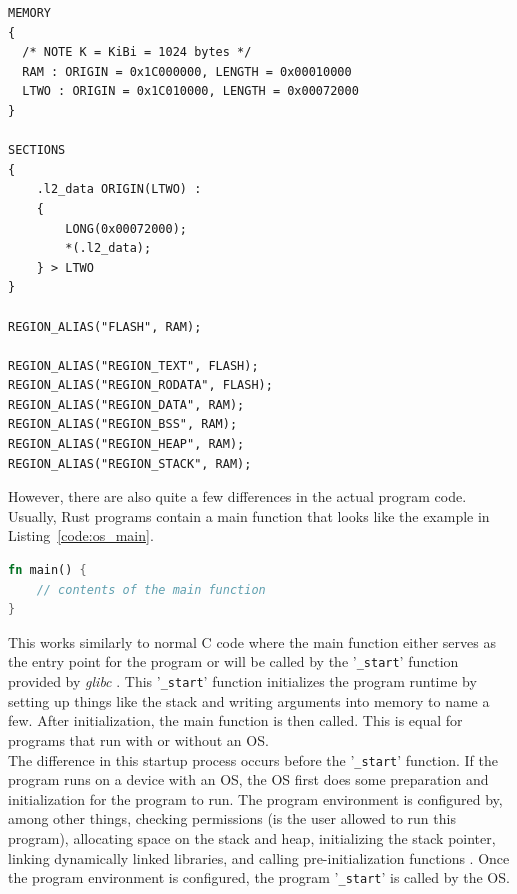 \begin{minipage}{\textwidth}
\begin{lstlisting}[style=colorEX,caption={Example memory.x file},label={code:memory_x}]
MEMORY
{
  /* NOTE K = KiBi = 1024 bytes */
  RAM : ORIGIN = 0x1C000000, LENGTH = 0x00010000
  LTWO : ORIGIN = 0x1C010000, LENGTH = 0x00072000
}

SECTIONS
{
    .l2_data ORIGIN(LTWO) :
    {
        LONG(0x00072000);
        *(.l2_data);
    } > LTWO
}

REGION_ALIAS("FLASH", RAM);

REGION_ALIAS("REGION_TEXT", FLASH);
REGION_ALIAS("REGION_RODATA", FLASH);
REGION_ALIAS("REGION_DATA", RAM);
REGION_ALIAS("REGION_BSS", RAM);
REGION_ALIAS("REGION_HEAP", RAM);
REGION_ALIAS("REGION_STACK", RAM);

\end{lstlisting}
\end{minipage}


However, there are also quite a few differences in the actual program code.
Usually, Rust programs contain a main function that looks like the example in Listing~\ref{code:os_main}.
\\
\begin{minipage}{\textwidth}
\begin{lstlisting}[style=colorEX,language=Rust,caption={Standard main function in Rust},label={code:os_main}]
fn main() {
    // contents of the main function
}
\end{lstlisting}
\end{minipage}

This works similarly to normal C code where the main function either serves as the entry point for the program or will be called by the '\lstinline{_start}' function provided by \emph{glibc} \cite{before_main}.
This '\lstinline{_start}' function initializes the program runtime by setting up things like the stack and writing arguments into memory to name a few.
After initialization, the main function is then called.
This is equal for programs that run with or without an OS.\\
The difference in this startup process occurs before the '\lstinline{_start}' function.
If the program runs on a device with an OS, the OS first does some preparation and initialization for the program to run.
The program environment is configured by, among other things, checking permissions (is the user allowed to run this program),
allocating space on the stack and heap, initializing the stack pointer, linking dynamically linked libraries, and calling pre-initialization functions \cite{before_main}.
Once the program environment is configured, the program '\lstinline{_start}' is called by the OS.


